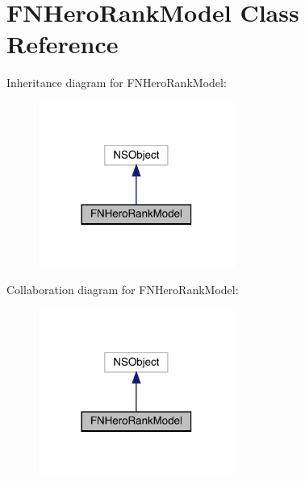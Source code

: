 \hypertarget{interface_f_n_hero_rank_model}{}\section{F\+N\+Hero\+Rank\+Model Class Reference}
\label{interface_f_n_hero_rank_model}


Inheritance diagram for F\+N\+Hero\+Rank\+Model\+:\nopagebreak
\begin{figure}[H]
\begin{center}
\leavevmode
\includegraphics[width=182pt]{interface_f_n_hero_rank_model__inherit__graph}
\end{center}
\end{figure}


Collaboration diagram for F\+N\+Hero\+Rank\+Model\+:\nopagebreak
\begin{figure}[H]
\begin{center}
\leavevmode
\includegraphics[width=182pt]{interface_f_n_hero_rank_model__coll__graph}
\end{center}
\end{figure}
